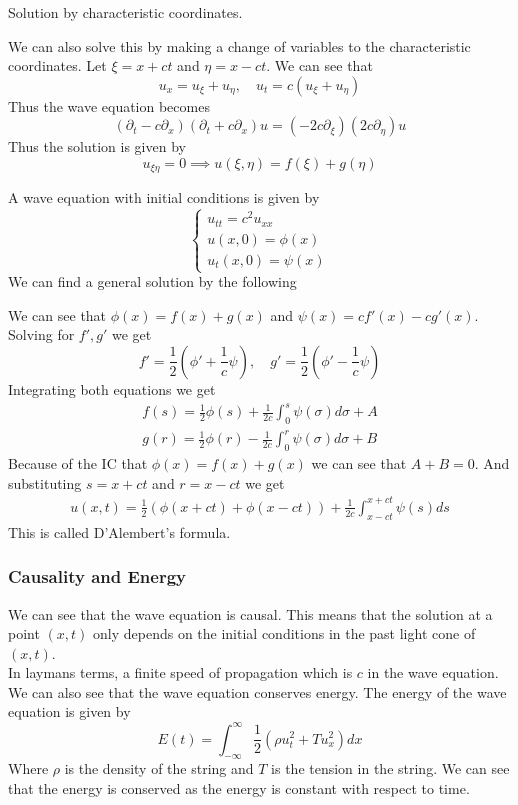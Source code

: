 \documentclass[answers,12pt,addpoints]{exam}
\begin{document}
    Solution by characteristic coordinates.
    \begin{solution}
        We can also solve this by making a change of variables to the characteristic coordinates. Let $\xi = x + ct$ and $\eta = x - ct$. We can see that
        $$ u_x = u_{\xi} + u_{\eta}, \quad u_t = c(u_{\xi} + u_{\eta})$$
        Thus the wave equation becomes
        $$ (\partial_t - c \partial_x)(\partial_t + c \partial_x)u = (-2c \partial_{\xi} )(2 c \partial_{\eta})u$$
        Thus the solution is given by
        $$ u_{\xi \eta} = 0 \implies u(\xi, \eta) = f(\xi) + g(\eta)$$
    \end{solution}
    A wave equation with initial conditions is given by
    $$ \begin{cases}
        u_{tt} = c^2 u_{xx}\\
        u(x, 0) = \phi(x)\\
        u_t(x, 0) = \psi(x)
    \end{cases}$$
    We can find a general solution by the following
    \begin{solution}
        We can see that $\phi(x) = f(x) + g(x)$ and $\psi(x) = cf'(x) - cg'(x)$. \\
        Solving for $f', g'$ we get
        $$ f' = \frac{1}{2}(\phi' + \frac{1}{c}\psi), \quad g' = \frac{1}{2}(\phi' - \frac{1}{c}\psi)$$
        Integrating both equations we get
        \begin{align*}
            f(s) = \frac{1}{2} \phi(s) + \frac{1}{2c} \int_{0}^{s} \psi(\sigma) d\sigma + A\\
            g(r) = \frac{1}{2} \phi(r) - \frac{1}{2c} \int_{0}^{r} \psi(\sigma) d\sigma + B
        \end{align*}
        Because of the IC that $\phi(x) = f(x) + g(x)$ we can see that $A + B = 0$. And substituting $s = x + ct$ and $r = x - ct$ we get
        \begin{align*}
            u(x, t) = \frac{1}{2}(\phi(x + ct) + \phi(x - ct)) + \frac{1}{2c} \int_{x - ct}^{x + ct} \psi(s) ds
        \end{align*}
        This is called D'Alembert's formula.
    \end{solution}
    \subsubsection{Causality and Energy}
    We can see that the wave equation is causal. This means that the solution at a point $(x, t)$ only depends on the initial conditions in the past light cone of $(x, t)$. \\
    In laymans terms, a finite speed of propagation which is $c$ in the wave equation.\\
    We can also see that the wave equation conserves energy. The energy of the wave equation is given by
    $$ E(t) = \int_{-\infty}^{\infty} \frac{1}{2}( \rho u_t^2 + T u_x^2) dx$$
    Where $\rho$ is the density of the string and $T$ is the tension in the string. We can see that the energy is conserved as the energy is constant with respect to time.
\end{document}
